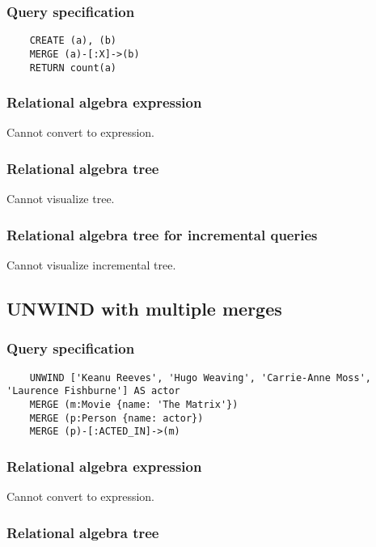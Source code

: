 	\subsubsection*{Query specification}

	\begin{lstlisting}
	CREATE (a), (b)
	MERGE (a)-[:X]->(b)
	RETURN count(a)
	\end{lstlisting}


	\subsubsection*{Relational algebra expression}

	Cannot convert to expression.

	\subsubsection*{Relational algebra tree}

	Cannot visualize tree.

	\subsubsection*{Relational algebra tree for incremental queries}

	Cannot visualize incremental tree.
	\subsection{UNWIND with multiple merges}

	\subsubsection*{Query specification}

	\begin{lstlisting}
	UNWIND ['Keanu Reeves', 'Hugo Weaving', 'Carrie-Anne Moss', 'Laurence Fishburne'] AS actor
	MERGE (m:Movie {name: 'The Matrix'})
	MERGE (p:Person {name: actor})
	MERGE (p)-[:ACTED_IN]->(m)
	\end{lstlisting}


	\subsubsection*{Relational algebra expression}

	Cannot convert to expression.

	\subsubsection*{Relational algebra tree}

